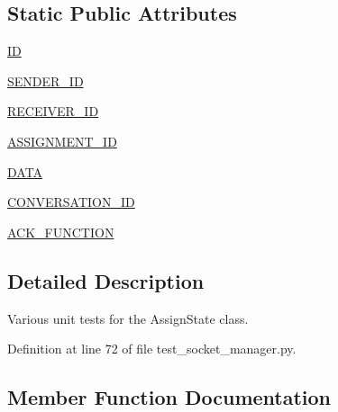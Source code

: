 \subsection*{Static Public Attributes}
\begin{DoxyCompactItemize}
\item 
\hyperlink{classparlai_1_1mturk_1_1core_1_1dev_1_1test_1_1test__socket__manager_1_1TestPacket_af96bca01d705227fd9c1e1f9317cd3cb}{ID}
\item 
\hyperlink{classparlai_1_1mturk_1_1core_1_1dev_1_1test_1_1test__socket__manager_1_1TestPacket_ae7d65da11678c8b2a39eb26fff060ab7}{S\+E\+N\+D\+E\+R\+\_\+\+ID}
\item 
\hyperlink{classparlai_1_1mturk_1_1core_1_1dev_1_1test_1_1test__socket__manager_1_1TestPacket_a136e70a062e97dda74034e1edb1862fa}{R\+E\+C\+E\+I\+V\+E\+R\+\_\+\+ID}
\item 
\hyperlink{classparlai_1_1mturk_1_1core_1_1dev_1_1test_1_1test__socket__manager_1_1TestPacket_a9c54ffa0efdafb2a585b537ebc2911fb}{A\+S\+S\+I\+G\+N\+M\+E\+N\+T\+\_\+\+ID}
\item 
\hyperlink{classparlai_1_1mturk_1_1core_1_1dev_1_1test_1_1test__socket__manager_1_1TestPacket_ae83f5662b66fa41ae91893c03983caab}{D\+A\+TA}
\item 
\hyperlink{classparlai_1_1mturk_1_1core_1_1dev_1_1test_1_1test__socket__manager_1_1TestPacket_a0f58d13d47d4d07169517e6e756d9fba}{C\+O\+N\+V\+E\+R\+S\+A\+T\+I\+O\+N\+\_\+\+ID}
\item 
\hyperlink{classparlai_1_1mturk_1_1core_1_1dev_1_1test_1_1test__socket__manager_1_1TestPacket_a5b888cd6c3c978a1fdf623fd2e91ab66}{A\+C\+K\+\_\+\+F\+U\+N\+C\+T\+I\+ON}
\end{DoxyCompactItemize}


\subsection{Detailed Description}
\begin{DoxyVerb}Various unit tests for the AssignState class.
\end{DoxyVerb}
 

Definition at line 72 of file test\+\_\+socket\+\_\+manager.\+py.



\subsection{Member Function Documentation}
\mbox{\label{classparlai_1_1mturk_1_1core_1_1dev_1_1test_1_1test__socket__manager_1_1TestPacket_a4196d80242bfccac6eb0348ab04da7ac}} 
